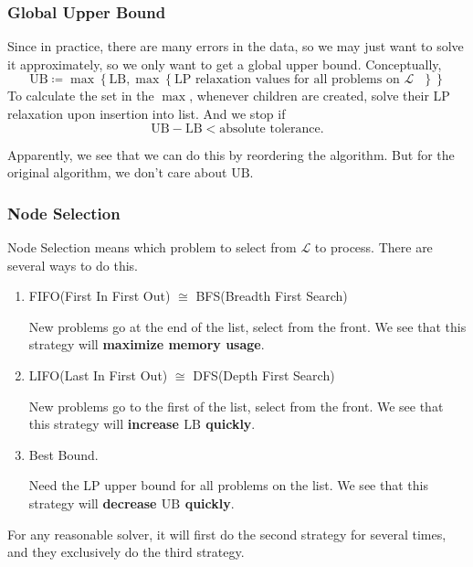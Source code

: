\subsubsection{Global Upper Bound}
Since in practice, there are many errors in the data, so we may just want to solve it approximately, so we only want to get a global upper bound.
Conceptually,
\[
	\mathrm{UB} \coloneqq \max\left\{\mathrm{LB}, \max\left\{\text{\(\mathrm{LP}\) relaxation values for all problems on \(\mathcal{L}\) }\right\}\right\}
\]
To calculate the set in the \(\max\), whenever children are created, solve their LP relaxation upon insertion into list. And we stop if
\[
	\mathrm{UB} - \mathrm{LB} < \text{absolute tolerance}.
\]

\begin{remark}
	Apparently, we see that we can do this by reordering the algorithm. But for the original algorithm, we don't care about \(\mathrm{UB}\).
\end{remark}

\subsubsection{Node Selection}
Node Selection means which problem to select from \(\mathcal{L} \) to process. There are several ways to do this.
\begin{enumerate}
	\item FIFO(First In First Out) \(\cong\) BFS(Breadth First Search)
	      \par New problems go at the end of the list, select from the front. We see that this strategy will \textbf{maximize memory usage}.
	\item LIFO(Last In First Out) \(\cong\) DFS(Depth First Search)
	      \par New problems go to the first of the list, select from the front. We see that this strategy will \textbf{increase \(\mathrm{LB}\) quickly}.
	\item Best Bound.
	      \par Need the LP upper bound for all problems on the list. We see that this strategy will \textbf{decrease \(\mathrm{UB}\) quickly}.
\end{enumerate}

\begin{remark}
	For any reasonable solver, it will first do the second strategy for several times, and they exclusively do the third strategy.
\end{remark}

